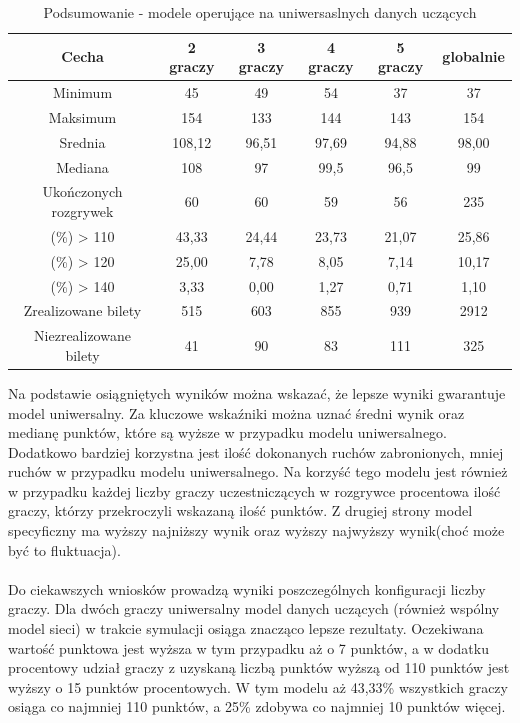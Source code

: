 \documentclass[12pt, oneside]{report}
\begin{document}
\begin{table}[h]
	\begin{center}
		\begin{tabular}{| c | c | c | c | c | c |} \hline
			Cecha & 2 graczy & 3 graczy & 4 graczy & 5 graczy & globalnie \\ \hline
			Minimum & 45 & 49 & 54 & 37 & 37 \\ \hline
			Maksimum & 154 & 133 & 144 & 143 & 154 \\ \hline
			Srednia & 108,12 & 96,51 & 97,69 & 94,88 & 98,00 \\ \hline
			Mediana & 108 & 97 & 99,5 & 96,5 & 99 \\ \hline
			Ukończonych rozgrywek & 60 & 60 & 59 & 56 & 235 \\ \hline
			(\%) > 110 & 43,33 & 24,44 & 23,73 & 21,07 & 25,86 \\ \hline
			(\%) > 120 & 25,00 & 7,78 & 8,05 & 7,14 & 10,17 \\ \hline
			(\%) > 140 & 3,33 & 0,00 & 1,27 & 0,71 & 1,10 \\ \hline
			Zrealizowane bilety & 515 & 603 & 855 & 939 & 2912 \\ \hline
			Niezrealizowane bilety & 41 & 90 & 83 & 111 & 325 \\ \hline
		\end{tabular}
		\caption{Podsumowanie - modele operujące na uniwersaslnych danych uczących}
		\label{table:nn_all_test}
	\end{center}
\end{table}
Na podstawie osiągniętych wyników można wskazać, że lepsze wyniki gwarantuje model uniwersalny. Za kluczowe wskaźniki można uznać średni wynik oraz medianę punktów, które są wyższe w przypadku modelu uniwersalnego. Dodatkowo bardziej korzystna jest ilość dokonanych ruchów zabronionych, mniej ruchów w przypadku modelu uniwersalnego. Na korzyść tego modelu jest również w przypadku każdej liczby graczy uczestniczących w rozgrywce procentowa ilość graczy, którzy przekroczyli wskazaną ilość punktów. Z drugiej strony model specyficzny ma wyższy najniższy wynik oraz wyższy najwyższy wynik(choć może być to fluktuacja). \\ \\ 
Do ciekawszych wniosków prowadzą wyniki poszczególnych konfiguracji liczby graczy. Dla dwóch graczy uniwersalny model danych uczących (również wspólny model sieci) w trakcie symulacji osiąga znacząco lepsze rezultaty. Oczekiwana wartość punktowa jest wyższa w tym przypadku aż o 7 punktów, a w dodatku procentowy udział graczy z uzyskaną liczbą punktów wyższą od 110 punktów jest wyższy o 15 punktów procentowych. W tym modelu aż 43,33\% wszystkich graczy osiąga co najmniej 110 punktów, a 25\% zdobywa co najmniej 10 punktów więcej. 
\end{document}
